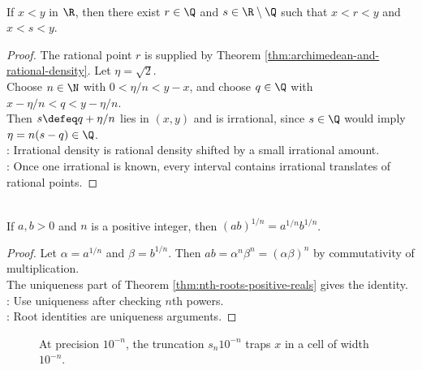 \begin{corollary} \label{cor:rationals-and-irrationals-dense} \\
If $x<y$ in $\R$, then there exist $r\in\Q$ and $s\in\R\setminus\Q$ such that $x<r<y$ and $x<s<y$.
\begin{proof}
The rational point $r$ is supplied by Theorem \ref{thm:archimedean-and-rational-density}. Let $\eta=\sqrt{2}$.\\
Choose $n\in\N$ with $0<\eta/n<y-x$, and choose $q\in\Q$ with $x-\eta/n<q<y-\eta/n$.\\
Then $s\defeq q+\eta/n$ lies in $(x,y)$ and is irrational, since $s\in\Q$ would imply $\eta=n(s-q)\in\Q$.\\
: Irrational density is rational density shifted by a small irrational amount.\\
: Once one irrational is known, every interval contains irrational translates of rational points.
\end{proof}
\end{corollary}

\begin{corollary} \label{cor:nth-root-product-positive-reals} \\
If $a,b>0$ and $n$ is a positive integer, then $(ab)^{1/n}=a^{1/n}b^{1/n}$.
\begin{proof}
Let $\alpha=a^{1/n}$ and $\beta=b^{1/n}$. Then $ab=\alpha^n\beta^n=(\alpha\beta)^n$ by commutativity of multiplication.\\
The uniqueness part of Theorem \ref{thm:nth-roots-positive-reals} gives the identity.\\
: Use uniqueness after checking $n$th powers.\\
: Root identities are uniqueness arguments.
\end{proof}
\end{corollary}

\begin{figure}[H]
  \centering
  
  \caption{At precision $10^{-n}$, the truncation $s_n10^{-n}$ traps $x$ in a cell of width $10^{-n}$.}
  \label{fig:decimal-truncation-squeeze}
\end{figure}

